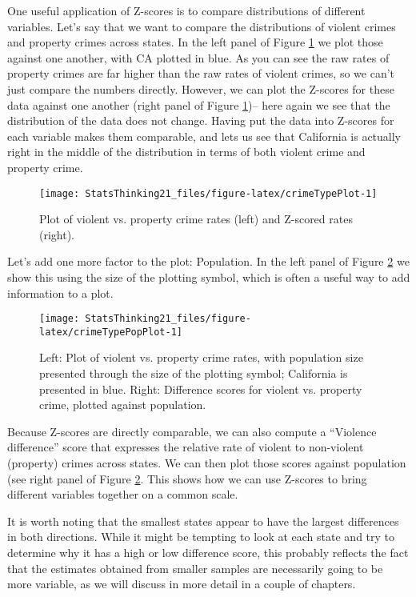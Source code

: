 \documentclass[]{book}
\theoremstyle{definition}
\theoremstyle{definition}
\theoremstyle{definition}
\theoremstyle{remark}
\begin{document}
One useful application of Z-scores is to compare distributions of
different variables. Let's say that we want to compare the distributions
of violent crimes and property crimes across states. In the left panel
of Figure \ref{fig:crimeTypePlot} we plot those against one another,
with CA plotted in blue. As you can see the raw rates of property crimes
are far higher than the raw rates of violent crimes, so we can't just
compare the numbers directly. However, we can plot the Z-scores for
these data against one another (right panel of Figure
\ref{fig:crimeTypePlot})-- here again we see that the distribution of
the data does not change. Having put the data into Z-scores for each
variable makes them comparable, and lets us see that California is
actually right in the middle of the distribution in terms of both
violent crime and property crime.

\begin{figure}
\texttt{[image: StatsThinking21\_files/figure-latex/crimeTypePlot-1]} \caption{Plot of violent vs. property crime rates (left) and Z-scored rates (right).}\label{fig:crimeTypePlot}
\end{figure}

Let's add one more factor to the plot: Population. In the left panel of
Figure \ref{fig:crimeTypePopPlot} we show this using the size of the
plotting symbol, which is often a useful way to add information to a
plot.

\begin{figure}
\texttt{[image: StatsThinking21\_files/figure-latex/crimeTypePopPlot-1]} \caption{Left: Plot of violent vs. property crime rates, with population size presented through the size of the plotting symbol; California is presented in blue. Right: Difference scores for violent vs. property crime, plotted against population. }\label{fig:crimeTypePopPlot}
\end{figure}

Because Z-scores are directly comparable, we can also compute a
``Violence difference'' score that expresses the relative rate of
violent to non-violent (property) crimes across states. We can then plot
those scores against population (see right panel of Figure
\ref{fig:crimeTypePopPlot}. This shows how we can use Z-scores to bring
different variables together on a common scale.

It is worth noting that the smallest states appear to have the largest
differences in both directions. While it might be tempting to look at
each state and try to determine why it has a high or low difference
score, this probably reflects the fact that the estimates obtained from
smaller samples are necessarily going to be more variable, as we will
discuss in more detail in a couple of chapters.
\end{document}
